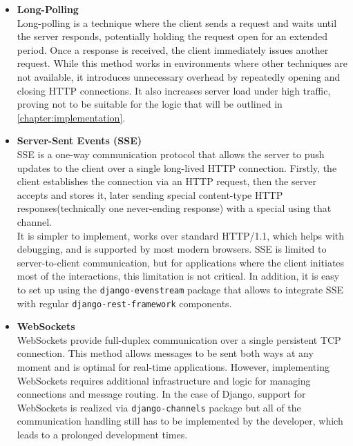 \begin{itemize}
    \item \textbf{Long-Polling} \\
    Long-polling is a technique where the client sends a request and waits until the server responds,
    potentially holding the request open for an extended period.
    Once a response is received, the client immediately issues another request.
    While this method works in environments where other techniques are not available,
    it introduces unnecessary overhead by repeatedly opening and closing HTTP connections.
    It also increases server load under high traffic, proving not to be suitable for the logic that will be outlined
    in \ref{chapter:implementation}.

    \item \textbf{Server-Sent Events (SSE)} \\
    SSE is a one-way communication protocol that allows the server to push updates to the client over a
    single long-lived HTTP connection. Firstly, the client establishes the connection via an HTTP request, then the
    server accepts and stores it, later sending special content-type HTTP responses(technically one never-ending response)
    with a special using that channel.\\
    It is simpler to implement, works over standard HTTP/1.1, which helps with debugging,
    and is supported by most modern browsers.\cite{sse}
    SSE is limited to server-to-client communication, but for applications where the client initiates
    most of the interactions, this limitation is not critical. In addition, it is easy to set up using the
    \texttt{django-evenstream}\cite{django_sse} package that allows to integrate
    SSE with regular \texttt{django-rest-framework} components.

    \item \textbf{WebSockets} \\
    WebSockets provide full-duplex communication over a single persistent TCP connection.
    This method allows messages to be sent both ways at any moment and is optimal for real-time applications\cite{websockets}.
    However, implementing WebSockets requires additional infrastructure and logic for
    managing connections and message routing. In the case of Django, support for WebSockets is realized via
    \texttt{django-channels} package but all of the communication handling still has to be implemented by the developer,
    which leads to a prolonged development times.


\end{itemize}
